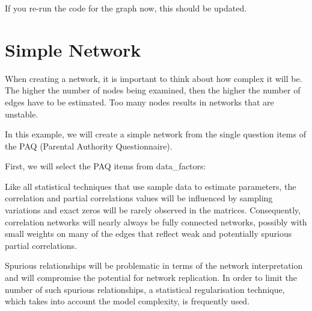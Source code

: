 \documentclass[]{book}
\newenvironment{Shaded}{\begin{snugshade}}{\end{snugshade}}
\newcommand{\DataTypeTok}[1]{\textcolor[rgb]{0.13,0.29,0.53}{#1}}
\newcommand{\KeywordTok}[1]{\textcolor[rgb]{0.13,0.29,0.53}{\textbf{#1}}}
\newcommand{\NormalTok}[1]{#1}
\newcommand{\OperatorTok}[1]{\textcolor[rgb]{0.81,0.36,0.00}{\textbf{#1}}}
\newcommand{\StringTok}[1]{\textcolor[rgb]{0.31,0.60,0.02}{#1}}
\begin{document}
If you re-run the code for the graph now, this should be updated.

\begin{Shaded}
\end{Shaded}

\hypertarget{simple-network}{%
\section{Simple Network}\label{simple-network}}

When creating a network, it is important to think about how complex it will be. The higher the number of nodes being examined, then the higher the number of edges have to be estimated. Too many nodes results in networks that are unstable.

In this example, we will create a simple network from the single question items of the PAQ (Parental Authority Questionnaire).

First, we will select the PAQ items from data\_factors:

\begin{Shaded}
\end{Shaded}

Like all statistical techniques that use sample data to estimate parameters, the correlation and partial correlations values will be influenced by sampling variations and exact zeros will be rarely observed in the matrices. Consequently, correlation networks will nearly always be fully connected networks, possibly with small weights on many of the edges that reflect weak and potentially spurious partial correlations.

Spurious relationships will be problematic in terms of the network interpretation and will compromise the potential for network replication. In order to limit the number of such spurious relationships, a statistical regularisation technique, which takes into account the model complexity, is frequently used.
\end{document}
